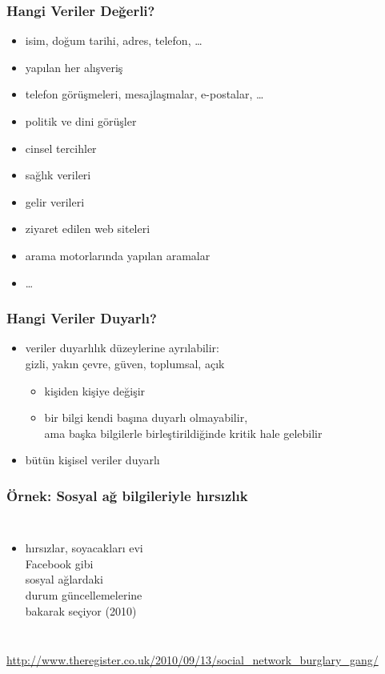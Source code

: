 \documentclass[dvipsnames]{beamer}
\theoremstyle{definition}
\theoremstyle{example}
\theoremstyle{plain}
\begin{document}
\begin{frame}
  \frametitle{Hangi Veriler Değerli?}

  \begin{itemize}
    \item isim, doğum tarihi, adres, telefon, \ldots
    \item yapılan her alışveriş
    \item telefon görüşmeleri, mesajlaşmalar, e-postalar, \ldots
    \item politik ve dini görüşler
    \item cinsel tercihler
    \item sağlık verileri
    \item gelir verileri
    \item ziyaret edilen web siteleri
    \item arama motorlarında yapılan aramalar
    \item \ldots
  \end{itemize}
\end{frame}

\begin{frame}
  \frametitle{Hangi Veriler Duyarlı?}

  \begin{itemize}
    \item veriler duyarlılık düzeylerine ayrılabilir:\\
      gizli, yakın çevre, güven, toplumsal, açık
    \begin{itemize}
      \item kişiden kişiye değişir
      \item bir bilgi kendi başına duyarlı olmayabilir,\\
        ama başka bilgilerle birleştirildiğinde kritik hale gelebilir
    \end{itemize}

    \bigskip
    \item bütün kişisel veriler duyarlı
  \end{itemize}
\end{frame}

\begin{frame}
  \frametitle{Örnek: Sosyal ağ bilgileriyle hırsızlık}

  \begin{columns}

    \begin{itemize}
      \item hırsızlar, soyacakları evi\\
        Facebook gibi\\
        sosyal ağlardaki\\
        durum güncellemelerine\\
        bakarak seçiyor (2010)
    \end{itemize}
  \end{columns}

  \medskip
  \tiny{\url{http://www.theregister.co.uk/2010/09/13/social_network_burglary_gang/}}\\
\end{frame}
\end{document}
